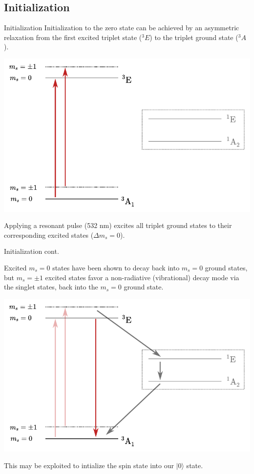 \documentclass[11pt]{beamer}
\begin{document}
\subsection{Initialization}
\begin{frame}{Initialization}
\small
Initialization to the zero state can be achieved by an asymmetric relaxation from the first excited triplet state ($^3E$) to the triplet ground state ($^3A$).


\begin{center}
\includegraphics[scale=0.6]{energy_init.pdf}
\end{center}

Applying a resonant pulse (532 nm) excites all triplet ground states to their corresponding excited states ($\Delta m_s=0$).
\end{frame}

\begin{frame}{Initialization cont.}\small

Excited $m_s=0$ states have been shown to decay back into $m_s=0$ ground states, but $m_s=\pm 1$ excited states favor a non-radiative (vibrational) decay mode via the singlet states, back into the $m_s=0$ ground state.

\begin{center}
\includegraphics[scale=0.6]{energy_init_relax.pdf}
\end{center}

This may be exploited to intialize the spin state into our $\vert 0 \rangle$ state.
\end{frame}
\end{document}
